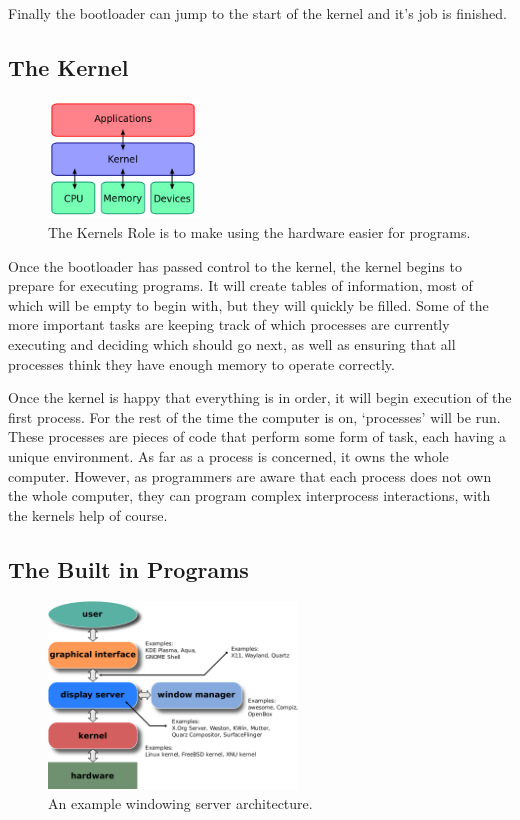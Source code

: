 \documentclass[a4paper]{report}
\begin{document}
Finally the bootloader can jump to the start of the kernel and it's job is finished.

\clearpage
\subsection{The Kernel}

\begin{figure}
\centering
\includegraphics[width=150px]{images/kernel}
\caption{The Kernels Role is to make using the hardware easier for programs.}
\vspace{-10pt}
\label{fig:thekernel}
\end{figure}

Once the bootloader has passed control to the kernel, the kernel begins to prepare for executing programs. It will create tables of information, most of which will be empty to begin with, but they will quickly be filled. Some of the more important tasks are keeping track of which processes are currently executing and deciding which should go next, as well as ensuring that all processes think they have enough memory to operate correctly.

Once the kernel is happy that everything is in order, it will begin execution of the first process. For the rest of the time the computer is on, `processes' will be run. These processes are pieces of code that perform some form of task, each having a unique environment. As far as a process is concerned, it owns the whole computer. However, as programmers are aware that each process does not own the whole computer, they can program complex interprocess interactions, with the kernels help of course.


\subsection{The Built in Programs}

\begin{figure}
\centering
\includegraphics[width=250px]{images/windowing}
\caption{An example windowing server architecture.}
\label{fig:theserver}
\end{figure}
\end{document}
